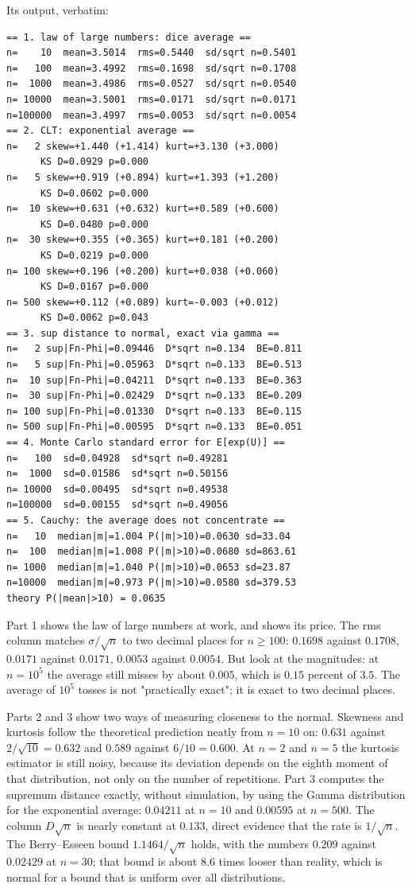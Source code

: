 Its output, verbatim:

\begin{verbatim}
== 1. law of large numbers: dice average ==
n=    10  mean=3.5014  rms=0.5440  sd/sqrt n=0.5401
n=   100  mean=3.4992  rms=0.1698  sd/sqrt n=0.1708
n=  1000  mean=3.4986  rms=0.0527  sd/sqrt n=0.0540
n= 10000  mean=3.5001  rms=0.0171  sd/sqrt n=0.0171
n=100000  mean=3.4997  rms=0.0053  sd/sqrt n=0.0054
== 2. CLT: exponential average ==
n=   2 skew=+1.440 (+1.414) kurt=+3.130 (+3.000)
      KS D=0.0929 p=0.000
n=   5 skew=+0.919 (+0.894) kurt=+1.393 (+1.200)
      KS D=0.0602 p=0.000
n=  10 skew=+0.631 (+0.632) kurt=+0.589 (+0.600)
      KS D=0.0480 p=0.000
n=  30 skew=+0.355 (+0.365) kurt=+0.181 (+0.200)
      KS D=0.0219 p=0.000
n= 100 skew=+0.196 (+0.200) kurt=+0.038 (+0.060)
      KS D=0.0167 p=0.000
n= 500 skew=+0.112 (+0.089) kurt=-0.003 (+0.012)
      KS D=0.0062 p=0.043
== 3. sup distance to normal, exact via gamma ==
n=   2 sup|Fn-Phi|=0.09446  D*sqrt n=0.134  BE=0.811
n=   5 sup|Fn-Phi|=0.05963  D*sqrt n=0.133  BE=0.513
n=  10 sup|Fn-Phi|=0.04211  D*sqrt n=0.133  BE=0.363
n=  30 sup|Fn-Phi|=0.02429  D*sqrt n=0.133  BE=0.209
n= 100 sup|Fn-Phi|=0.01330  D*sqrt n=0.133  BE=0.115
n= 500 sup|Fn-Phi|=0.00595  D*sqrt n=0.133  BE=0.051
== 4. Monte Carlo standard error for E[exp(U)] ==
n=   100  sd=0.04928  sd*sqrt n=0.49281
n=  1000  sd=0.01586  sd*sqrt n=0.50156
n= 10000  sd=0.00495  sd*sqrt n=0.49538
n=100000  sd=0.00155  sd*sqrt n=0.49056
== 5. Cauchy: the average does not concentrate ==
n=   10  median|m|=1.004 P(|m|>10)=0.0630 sd=33.04
n=  100  median|m|=1.008 P(|m|>10)=0.0680 sd=863.61
n= 1000  median|m|=1.040 P(|m|>10)=0.0653 sd=23.87
n=10000  median|m|=0.973 P(|m|>10)=0.0580 sd=379.53
theory P(|mean|>10) = 0.0635
\end{verbatim}

Part 1 shows the law of large numbers at work, and shows its price. The rms column
matches $\sigma/\sqrt n$ to two decimal places for $n\ge100$: $0.1698$ against
$0.1708$, $0.0171$ against $0.0171$, $0.0053$ against $0.0054$. But look
at the magnitudes: at $n=10^5$ the average still misses by about $0.005$, which is
$0.15$ percent of $3.5$. The average of $10^5$ tosses is not "practically
exact"; it is exact to two decimal places.

Parts 2 and 3 show two ways of measuring closeness to the normal. Skewness and
kurtosis follow the theoretical prediction neatly from $n=10$ on: $0.631$ against
$2/\sqrt{10}=0.632$ and $0.589$ against $6/10=0.600$. At $n=2$ and $n=5$ the
kurtosis estimator is still noisy, because its deviation depends on the eighth moment
of that distribution, not only on the number of repetitions. Part 3 computes the
supremum distance exactly, without simulation, by using the Gamma distribution for
the exponential average: $0.04211$ at $n=10$ and $0.00595$ at $n=500$. The column
$D\sqrt n$ is nearly constant at $0.133$, direct evidence that the rate is
$1/\sqrt n$. The Berry--Esseen bound $1.1464/\sqrt n$ holds, with the numbers
$0.209$ against $0.02429$ at $n=30$; that bound is about $8.6$ times looser
than reality, which is normal for a bound that is uniform over all distributions.

